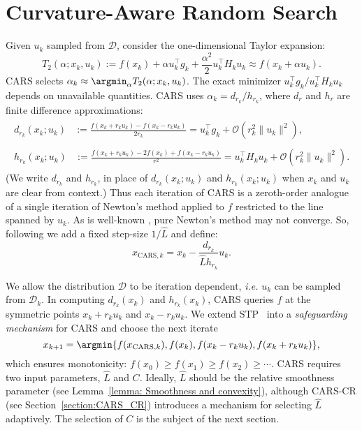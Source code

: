 \section{Curvature-Aware Random Search}\label{sec:CARS}
Given $u_k$ sampled from $\mathcal{D}$, consider the one-dimensional Taylor expansion:
\begin{equation} \label{eq: T2 Taylor poly of 2nd order}
    T_{2}(\alpha;x_k,u_k) := f(x_k) + \alpha u_k^{\top} g_k + \frac{\alpha^2}{2} u_k^{\top} H_k u_k \approx f(x_k + \alpha u_k).
\end{equation}
CARS selects $\alpha_k \approx \argmin_{\alpha}T_{2}(\alpha;x_k,u_k)$. The exact minimizer  $u_k^{\top} g_k/u_k^{\top} H_k u_k$ depends on unavailable quantities. CARS uses $\alpha_k = d_{r_k}/h_{r_k}$, where $d_{r}$ and $h_{r}$ are finite difference approximations:
\begin{align}
    \begin{split}
        d_{r_k}(x_k;u_k) &:= \frac{f(x_k+r_k u_k) - f(x_k-r_k u_k)}{2r_k}
        = u_k^{\top}g_k + \mathcal{O}(r_k^2\|u_k\|^2),
    \end{split} \label{eq:Compute_d} \\
    \begin{split}
        h_{r_k}(x_k;u_k) & := \frac{f(x_k+r_k u_k) - 2f(x_k) + f(x_k-r_k u_k)}{r^2}
        = u_k^{\top}H_k u_k + \mathcal{O}(r_k^2\|u_k\|^2).
    \end{split}\label{eq:Compute_h}
\end{align}
(We write $d_{r_k}$ and $h_{r_k}$, in place of $d_{r_k}(x_k;u_k)$ and $h_{r_k}(x_k;u_k)$ when $x_k$ and $u_k$ are clear from context.) Thus each iteration of CARS is a zeroth-order analogue of a single iteration of Newton's method applied to $f$ restricted to the line spanned by $u_k$. As is well-known \cite{nesterov2006cubic}, pure Newton's method may not converge. So, following \cite{gower2019rsn} we add a fixed step-size $1/\hat{L}$ and define:
\begin{equation}
    x_{\mathrm{CARS, }k} = x_k - \frac{d_{r_k}}{\hat{L}h_{r_k}} u_k.
    \label{eq: Define CARS}
\end{equation}

We allow the distribution $\mathcal{D}$ to be iteration dependent, {\em i.e.} $u_k$ can be sampled from $\mathcal{D}_k$. In computing $d_{r_k}(x_k)$ and $h_{r_k}(x_k)$, CARS queries $f$ at the symmetric points $x_k + r_k u_k$ and $x_k - r_k u_k$.
We extend STP~\cite{bergou2020stochastic} into a {\em safeguarding mechanism} for CARS and
choose the next iterate
\begin{equation*}
    x_{k+1} = \argmin \{ f(x_{\mathrm{CARS}, k}), f(x_k), f(x_k - r_k u_k), f(x_k + r_k u_k) \},
\end{equation*}
which ensures monotonicity:
$f(x_0)\geq f(x_1) \geq f(x_2) \geq \cdots $. CARS requires two input parameters, $\hat{L}$ and $C$. Ideally, $\hat{L}$ should be the relative smoothness parameter (see Lemma~\ref{lemma: Smoothness and convexity}), although CARS-CR (see Section~\ref{section:CARS_CR}) introduces a mechanism for selecting $\hat{L}$ adaptively. The selection of $C$ is the subject of the next section.

